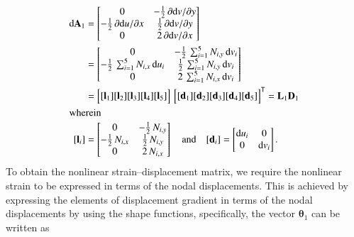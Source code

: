 \begin{subequations}
	\begin{align}
	\mathrm{d} \mathbf{A}_1 & =  \begin{bmatrix}
	0 &  - \tfrac{1}{2} \, \partial \mathrm{d} v / \partial y \\
	-\tfrac{1}{2} \, \partial \mathrm{d} u / \partial x &  \tfrac{1}{2} \, \partial \mathrm{d} v / \partial y \\
	0  & 2 \, \partial \mathrm{d} v / \partial x  \end{bmatrix} \notag \\
	& = \begin{bmatrix}
	0 &  - \tfrac{1}{2} \, \sum\nolimits_{i=1}^5 N_{i,y} \, \mathrm{d} v_i \\
	-\tfrac{1}{2} \, \sum\nolimits_{i=1}^5 N_{i,x} \, \mathrm{d} u_i &  \tfrac{1}{2} \, \sum\nolimits_{i=1}^5 N_{i,y} \, \mathrm{d} v_i \\
	0  & 2 \, \sum\nolimits_{i=1}^5 N_{i,x} \, \mathrm{d} v_i  \end{bmatrix}\notag \\
	& = \begin{bmatrix}
	[\mathbf{l}_1] [\mathbf{l}_2] [\mathbf{l}_3] [\mathbf{l}_4] [\mathbf{l}_5] 
	\end{bmatrix} \, \begin{bmatrix} [\mathbf{d}_1] [\mathbf{d}_2] [\mathbf{d}_3] [\mathbf{d}_4] [\mathbf{d}_5] \end{bmatrix}^{\mathsf{T}}
	= \mathbf{L}_1 \mathbf{D}_1 \\
	\intertext{wherein}
	[\mathbf{l}_i] & = \begin{bmatrix}
	0 &  - \tfrac{1}{2} \, N_{i,y} \\
	-\tfrac{1}{2} \, N_{i,x} &  \tfrac{1}{2} \, N_{i,y} \\
	0 & 2 \, N_{i,x} \end{bmatrix}  \quad \text{and} \quad	[\mathbf{d}_i] = \begin{bmatrix}
	\mathrm{d} u_i & 0 \\
	0 &  \mathrm{d} v_i  \end{bmatrix} .
	\end{align}
\end{subequations}
To obtain the nonlinear strain--displacement matrix, we require the nonlinear strain to be expressed in terms of the nodal displacements. This is achieved by expressing the elements of displacement gradient in terms of the nodal displacements by using the shape functions, specifically, the vector $\boldsymbol{\theta}_1$ can be written as
